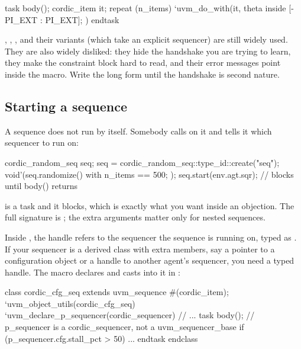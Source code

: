 \begin{uvmcode}
task body();
  cordic_item it;
  repeat (n_items)
    `uvm_do_with(it, { theta inside {[-PI_EXT : PI_EXT]}; })
endtask
\end{uvmcode}

, , ,
 and their  variants (which take an explicit
sequencer) are still widely used. They are also widely disliked: they hide
the handshake you are trying to learn, they make the constraint block hard to
read, and their error messages point inside the macro. Write the long form
until the handshake is second nature.

\subsection{Starting a sequence}

A sequence does not run by itself. Somebody calls  on it and
tells it which sequencer to run on:

\begin{uvmcode}
cordic_random_seq seq;
seq = cordic_random_seq::type_id::create("seq");
void'(seq.randomize() with { n_items == 500; });
seq.start(env.agt.sqr);      // blocks until body() returns
\end{uvmcode}

 is a task and it blocks, which is exactly what you want inside
an objection. The full signature is
; the extra
arguments matter only for nested sequences.

Inside , the handle  refers to the sequencer
the sequence is running on, typed as . If your
sequencer is a derived class with extra members, say a pointer to a
configuration object or a handle to another agent's sequencer, you need a
typed handle. The macro  declares
 and casts  into it in :

\begin{uvmcode}
class cordic_cfg_seq extends uvm_sequence #(cordic_item);
  `uvm_object_utils(cordic_cfg_seq)
  `uvm_declare_p_sequencer(cordic_sequencer)
  // ...
  task body();
    // p_sequencer is a cordic_sequencer, not a uvm_sequencer_base
    if (p_sequencer.cfg.stall_pct > 50) ...
  endtask
endclass
\end{uvmcode}


